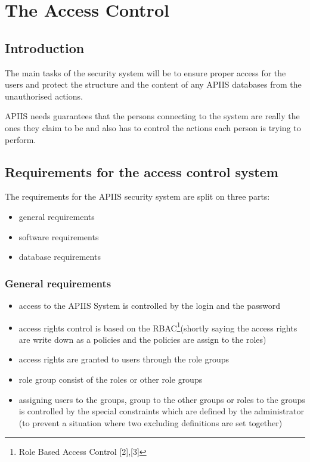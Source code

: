 \chapter{The Access Control}

\section{Introduction}
The main tasks of the security system will be to ensure proper access
for the users and protect the structure and the content of any APIIS
databases from the unauthorised actions. 

APIIS needs guarantees that the persons connecting to the system
are really the ones they claim to be and also has to control the actions
each person is trying to perform. 


\section{Requirements for the access control system }

The requirements for the APIIS security system are split on three parts:

\begin{itemize}
\item general requirements
\item software requirements
\item database requirements
\end{itemize}

\subsection{General requirements \label{generalrequirements}}
\begin{itemize}
\item access to the APIIS System is controlled by the login and the password
\item access rights control is based on the RBAC\footnote{Role Based Access Control [2],[3]}(shortly saying the access rights are write down as a policies and the policies are assign to the roles)
\item access rights are granted to users through the role groups 
\item role group consist of the roles or other role groups
\item assigning users to the groups, group to the other groups or roles to the groups is controlled by the special constraints which are defined by the administrator (to prevent a situation where two excluding definitions are set together)   
\end{itemize}
